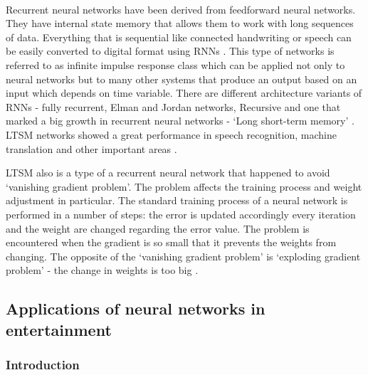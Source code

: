 \documentclass[12pt]{report}
\begin{document}
    \paragraph{}

    Recurrent neural networks have been derived from feedforward neural networks. They have internal state memory that allows them to work with long sequences of data. Everything that is sequential like connected handwriting or speech can be easily converted to digital format using RNNs \citep{rnn_article}.
    This type of networks is referred to as infinite impulse response class which can be applied not only to neural networks but to many other systems that produce an output based on an input which depends on time variable. 
    There are different architecture variants of RNNs - fully recurrent, Elman and Jordan networks, Recursive and one that marked a big growth in recurrent neural networks - `Long short-term memory' \citep{10.1162/neco.1997.9.8.1735}.
    LTSM networks showed a great performance in speech recognition, machine translation and other important areas \citep{ltsm_article}.

    LTSM also is a type of a recurrent neural network that happened to avoid `vanishing gradient problem'. The problem affects the training process and weight adjustment in particular. The standard training process of a neural network is performed in a number of steps:
    the error is updated accordingly every iteration and the weight are changed regarding the error value. The problem is encountered when the gradient is so small that it prevents the weights from changing. The opposite of the `vanishing gradient problem' is `exploding gradient problem' - the change in weights is too big \citep{vanishing_weight}.

    \subsection*{Applications of neural networks in entertainment}

    \subsubsection*{Introduction}
    \paragraph{}
\end{document}
